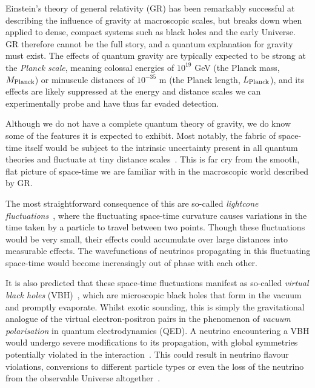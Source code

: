 \documentclass[a4paper,11pt]{article}
\begin{document}
Einstein's theory of general relativity (GR) has been remarkably successful at describing the influence of gravity at macroscopic scales, but breaks down when applied to dense, compact systems such as black holes and the early Universe. GR therefore cannot be the full story, and a quantum explanation for gravity must exist. The effects of quantum gravity are typically expected to be strong at the \textit{Planck scale}, meaning colossal energies of $10^{19}$ GeV (the Planck mass, $M_{\rm{Planck}}$) or minuscule distances of $10^{-35}$ m (the Planck length, $L_{\rm{Planck}}$), and its effects are likely suppressed at the energy and distance scales we can experimentally probe and have thus far evaded detection.


Although we do not have a complete quantum theory of gravity, we do know some of the features it is expected to exhibit. Most notably, the fabric of space-time itself would be subject to the intrinsic uncertainty present in all quantum theories and fluctuate at tiny distance scales~\cite{PhysRev.97.511, Hawking}. This is far cry from the smooth, flat picture of space-time we are familiar with in the macroscopic world described by GR. 

The most straightforward consequence of this are so-called \textit{lightcone fluctuations}~\cite{PauliLightcone, Ford1999, gr-qc/9909085, Ellis:1999jf}, where the fluctuating space-time curvature causes variations in the time taken by a particle to travel between two points. Though these fluctuations would be very small, their effects could accumulate over large distances into measurable effects. The wavefunctions of neutrinos propagating in this fluctuating space-time would become increasingly out of phase with each other.

It is also predicted that these space-time fluctuations manifest as so-called \textit{virtual black holes} (VBH)~\cite{Hawking1982,PhysRevD.53.3099}, which are microscopic black holes that form in the vacuum and promptly evaporate. Whilst exotic sounding, this is simply the gravitational analogue of the virtual electron-positron pairs in  the phenomenon of \textit{vacuum polarisation} in quantum electrodynamics (QED). A neutrino encountering a VBH would undergo severe modifications to its propagation, with global symmetries potentially violated in the interaction~\cite{Anchordoqui:2005gj, Harlow:2018jwu, PhysRevD.102.115003, Hellmann:2021jyz}. This could result in neutrino flavour violations, conversions to different particle types or even the loss of the neutrino from the observable Universe altogether~\cite{Anchordoqui:2005gj, Anchordoqui:2006xv, Witten:2017hdv}.
\end{document}
